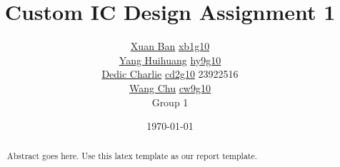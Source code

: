 \documentclass{IEEEtran}			 %
\begin{document}
\title      {Custom IC Design Assignment 1}
\author    {

\texorpdfstring {\href{mailto:xb1g10@ecs.soton.ac.uk}{Xuan Ban}} {Xuan Ban}  
\texorpdfstring {\href{mailto:xb1g10@ecs.soton.ac.uk}{xb1g10}} {xb1g10} \\ 
    {\href{mailto:xb1g10@ecs.soton.ac.uk}{Yang Huihuang}} 
	\texorpdfstring  {\href{mailto:hy9g10@ecs.soton.ac.uk}{hy9g10}} {hy9g10} \\   
    {\href{mailto:xb1g10@ecs.soton.ac.uk}{Dedic Charlie}} 
	\texorpdfstring  {\href{mailto:cd2g11@ecs.soton.ac.uk}{cd2g10}} {cd2g11} {23922516} \\
    {\href{mailto:xb1g10@ecs.soton.ac.uk}{Wang Chu}}             
	\texorpdfstring  {\href{mailto:cd2g10@ecs.soton.ac.uk}{cw9g10}} {cw9g10} \\
	Group 1
            }
\date       {\today}

\maketitle

\begin{abstract}
Abstract goes here. Use this latex template as our report template.
\end{abstract}
















%
%
%
%
%
\end{document}
